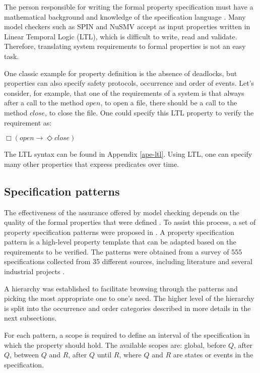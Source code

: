 The person responsible for writing the formal property specification must have a mathematical background and knowledge of the specification language \cite{Prospec}. Many model checkers such as SPIN and NuSMV accept as input properties written in Linear Temporal Logic (LTL), which is difficult to write, read and validate. Therefore, translating system requirements to formal properties is not an easy task.

One classic example for property definition is the absence of deadlocks, but properties can also specify safety protocols\cite{Merz}, occurrence and order of events. Let's consider, for example, that one of the requirements of a system is that always after a call to the method $open$, to open a file, there should be a call to the method $close$, to close the file. One could specify this LTL property to verify the requirement as:

\begin{center}
$\Box (open \rightarrow \Diamond close)$
\end{center}

The LTL syntax can be found in Appendix \ref{ape-ltl}. Using LTL, one can specify many other properties that express predicates over time.

\subsection{Specification patterns}
\label{specpatterns}

The effectiveness of the assurance offered by model checking depends on the quality of the formal properties that were defined \cite{Prospec}. To assist this process, a set of property specification patterns were proposed in \cite{dwyer98}. A property specification pattern is a high-level property template that can be adapted based on the requirements to be verified. The patterns were obtained from a survey of 555 specifications collected from 35 different sources, including literature and several industrial projects \cite{dwyer99:specpatt_survey}.

A hierarchy was established to facilitate browsing through the patterns and picking the most appropriate one to one's need. The higher level of the hierarchy is split into the occurrence and order categories described in more details in the next subsections.

For each pattern, a scope is required to define an interval of the specification in which the property should hold. The available scopes are: global, before $Q$, after $Q$, between $Q$ and $R$, after $Q$ until $R$, where $Q$ and $R$ are states or events in the specification.

